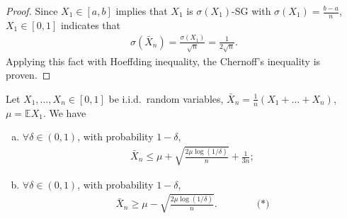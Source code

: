 \documentclass[twoside]{article}
\begin{document}
\begin{proof}
    Since $X_1\in[a,b]$ implies that $X_1$ is $\sigma(X_1)$-SG with $\sigma(X_1)= \frac{b-a}{n}$, $X_1\in[0,1]$ indicates that
    \begin{align*}
        \sigma(\bar{X}_n) = \frac{ \sigma(X_1) }{ \sqrt{n} } = \frac{1}{ 2\sqrt{n} }.
    \end{align*}
    Applying this fact with Hoeffding inequality, the Chernoff's inequality is proven.
\end{proof}

\begin{theorem}
    Let $X_1,\ldots, X_n\in [0,1]$ be i.i.d.\ random variables, $\bar{X}_n=\frac{1}{n}(X_1+\ldots+X_n)$, $\mu = \mathbb{E}X_1$. We have
    \begin{enumerate}[(a)]
        \item $\forall \delta\in (0,1)$, with probability $1-\delta$,
    \begin{align*}
        \bar{X}_n \le \mu + \sqrt{\frac{2\mu\log(1/\delta)}{n}}+\frac{1}{3n};  
    \end{align*}
    \item $\forall \delta\in (0,1)$, with probability $1-\delta$,
    \begin{align*}
        \bar{X}_n \ge \mu - \sqrt{\frac{2\mu\log(1/\delta)}{n}}.    \qquad\qquad \text{(*)}
    \end{align*}
    \end{enumerate}
  
\end{theorem}
\end{document}

